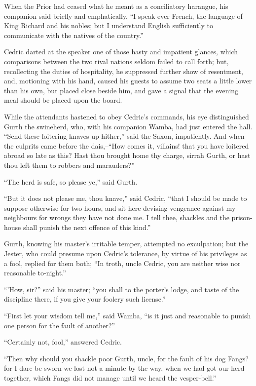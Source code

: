 When the Prior had ceased what he meant as a conciliatory harangue, his
companion said briefly and emphatically, ``I speak ever French, the
language of King Richard and his nobles; but I understand English
sufficiently to communicate with the natives of the country.''

Cedric darted at the speaker one of those hasty and impatient glances,
which comparisons between the two rival nations seldom failed to call
forth; but, recollecting the duties of hospitality, he suppressed
further show of resentment, and, motioning with his hand, caused his
guests to assume two seats a little lower than his own, but placed close
beside him, and gave a signal that the evening meal should be placed
upon the board.

While the attendants hastened to obey Cedric's commands, his eye
distinguished Gurth the swineherd, who, with his companion Wamba, had
just entered the hall. ``Send these loitering knaves up hither,'' said
the Saxon, impatiently. And when the culprits came before the
dais,--``How comes it, villains! that you have loitered abroad so late
as this? Hast thou brought home thy charge, sirrah Gurth, or hast thou
left them to robbers and marauders?''

``The herd is safe, so please ye,'' said Gurth.

``But it does not please me, thou knave,'' said Cedric, ``that I should
be made to suppose otherwise for two hours, and sit here devising
vengeance against my neighbours for wrongs they have not done me. I tell
thee, shackles and the prison-house shall punish the next offence of
this kind.''

Gurth, knowing his master's irritable temper, attempted no exculpation;
but the Jester, who could presume upon Cedric's tolerance, by virtue of
his privileges as a fool, replied for them both; ``In troth, uncle
Cedric, you are neither wise nor reasonable to-night.''

``'How, sir?'' said his master; ``you shall to the porter's lodge, and
taste of the discipline there, if you give your foolery such license.''

``First let your wisdom tell me,'' said Wamba, ``is it just and
reasonable to punish one person for the fault of another?''

``Certainly not, fool,'' answered Cedric.

``Then why should you shackle poor Gurth, uncle, for the fault of his
dog Fangs? for I dare be sworn we lost not a minute by the way, when we
had got our herd together, which Fangs did not manage until we heard the
vesper-bell.''


